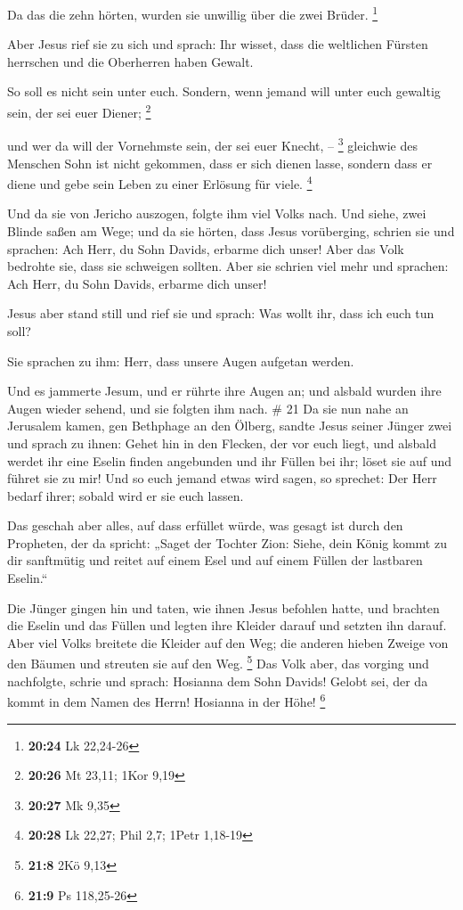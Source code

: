  Da das die zehn hörten, wurden sie unwillig über die zwei
Brüder. \footnote{\textbf{20:24} Lk 22,24-26}

 Aber Jesus rief sie zu sich und sprach: Ihr wisset, dass
die weltlichen Fürsten herrschen und die Oberherren haben Gewalt.

 So soll es nicht sein unter euch. Sondern, wenn jemand
will unter euch gewaltig sein, der sei euer Diener; \footnote{\textbf{20:26}
  Mt 23,11; 1Kor 9,19}

 und wer da will der Vornehmste sein, der sei euer Knecht,
-- \footnote{\textbf{20:27} Mk 9,35}  gleichwie des
Menschen Sohn ist nicht gekommen, dass er sich dienen lasse, sondern
dass er diene und gebe sein Leben zu einer Erlösung für viele.
\footnote{\textbf{20:28} Lk 22,27; Phil 2,7; 1Petr 1,18-19}

 Und da sie von Jericho auszogen, folgte ihm viel Volks
nach.  Und siehe, zwei Blinde saßen am Wege; und da sie
hörten, dass Jesus vorüberging, schrien sie und sprachen: Ach Herr, du
Sohn Davids, erbarme dich unser!  Aber das Volk bedrohte
sie, dass sie schweigen sollten. Aber sie schrien viel mehr und
sprachen: Ach Herr, du Sohn Davids, erbarme dich unser!

 Jesus aber stand still und rief sie und sprach: Was wollt
ihr, dass ich euch tun soll?

 Sie sprachen zu ihm: Herr, dass unsere Augen aufgetan
werden.

 Und es jammerte Jesum, und er rührte ihre Augen an; und
alsbald wurden ihre Augen wieder sehend, und sie folgten ihm nach. \# 21
 Da sie nun nahe an Jerusalem kamen, gen Bethphage an den
Ölberg, sandte Jesus seiner Jünger zwei  und sprach zu
ihnen: Gehet hin in den Flecken, der vor euch liegt, und alsbald werdet
ihr eine Eselin finden angebunden und ihr Füllen bei ihr; löset sie auf
und führet sie zu mir!  Und so euch jemand etwas wird sagen,
so sprechet: Der Herr bedarf ihrer; sobald wird er sie euch lassen.

 Das geschah aber alles, auf dass erfüllet würde, was gesagt
ist durch den Propheten, der da spricht:  „Saget der Tochter
Zion: Siehe, dein König kommt zu dir sanftmütig und reitet auf einem
Esel und auf einem Füllen der lastbaren Eselin.``

 Die Jünger gingen hin und taten, wie ihnen Jesus befohlen
hatte,  und brachten die Eselin und das Füllen und legten
ihre Kleider darauf und setzten ihn darauf.  Aber viel Volks
breitete die Kleider auf den Weg; die anderen hieben Zweige von den
Bäumen und streuten sie auf den Weg. \footnote{\textbf{21:8} 2Kö 9,13}
 Das Volk aber, das vorging und nachfolgte, schrie und
sprach: Hosianna dem Sohn Davids! Gelobt sei, der da kommt in dem Namen
des Herrn! Hosianna in der Höhe! \footnote{\textbf{21:9} Ps 118,25-26}

